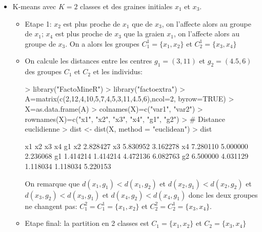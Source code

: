 \documentclass[a4paper]{article}
\begin{document}
\begin{itemize}
\item K-means avec $K=2$ classes et des graines initiales $x_1$ et $x_3$.

\begin{itemize}
\item Etape 1:  $x_2$ est plus proche de  $x_1$ que de  $x_3$, on l'affecte alors au groupe de  $x_1$;  $x_4$ est plus proche de  $x_3$ que la graien  $x_1$, on l'affecte alors au groupe de  $x_3$. On a alors les groupes $C_1^1=\{x_1,x_2\}$ et  $C_2^1=\{x_3,x_4\}$
\item On calcule les distances entre les centres $g_1=(3,11)$ et $g_2=(4.5,6)$  des groupes $C_1$ et $C_2$ et les individus: 
\begin{Schunk}
\begin{Sinput}
> library("FactoMineR")
> library("factoextra")
> A=matrix(c(2,12,4,10,5,7,4,5,3,11,4.5,6),ncol=2, byrow=TRUE)
> X=as.data.frame(A)
> colnames(X)=c("var1", "var2")
> rownames(X)=c("x1", "x2", "x3", "x4", "g1", "g2")
> # Distance euclidienne
> dist <- dist(X, method = "euclidean")
> dist
\end{Sinput}
\begin{Soutput}
         x1       x2       x3       x4       g1
x2 2.828427                                    
x3 5.830952 3.162278                           
x4 7.280110 5.000000 2.236068                  
g1 1.414214 1.414214 4.472136 6.082763         
g2 6.500000 4.031129 1.118034 1.118034 5.220153
\end{Soutput}
\end{Schunk}
On remarque que $d(x_1,g_1)<d(x_1,g_2)$ et $d(x_2,g_1)<d(x_2,g_2)$ et $d(x_3,g_2)<d(x_3,g_1)$ et $d(x_4,g_2)<d(x_4,g_1)$ donc les deux groupes ne changent pas: $C_1^2=C_1^1=\{x_1,x_2\}$ et  $C_2^2=C_2^1=\{x_3,x_4\}$. 
\item Etape final: la partition en 2 classes est 
$C_1=\{x_1,x_2\}$ et  $C_2=\{x_3,x_4\}$


\end{itemize}
\end{itemize}
\end{document}
